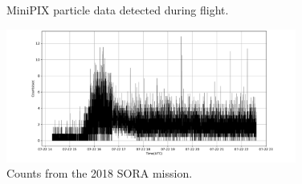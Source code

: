 \begin{figure}[h!]
\hfill
{}
\hfill
{}
\hfill
\caption{MiniPIX particle data detected during flight.}
\label{fig:fitpix-data}
\end{figure}

\begin{figure}[h!]
	\begin{center}
	\includegraphics[width=0.85\textwidth]{figures/counts_per_second_2018.pdf}
	\caption{Counts from the 2018 SORA mission.}
	\label{fig:2018-minipix-data}
	\end{center}
\end{figure}

